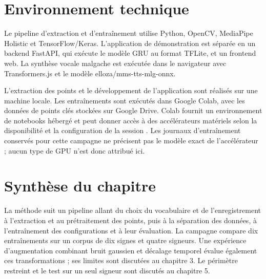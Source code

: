 \section{Environnement technique}

Le pipeline d'extraction et d'entraînement utilise Python, OpenCV, MediaPipe Holistic et TensorFlow/Keras. L'application de démonstration est séparée en un backend FastAPI, qui exécute le modèle GRU au format TFLite, et un frontend web. La synthèse vocale malgache est exécutée dans le navigateur avec Transformers.js et le modèle elloza/mms-tts-mlg-onnx.

L'extraction des points et le développement de l'application sont réalisés sur une machine locale. Les entraînements sont exécutés dans Google Colab, avec les données de points clés stockées sur Google Drive. Colab fournit un environnement de notebooks hébergé et peut donner accès à des accélérateurs matériels selon la disponibilité et la configuration de la session . Les journaux d'entraînement conservés pour cette campagne ne précisent pas le modèle exact de l'accélérateur ; aucun type de GPU n'est donc attribué ici.

\section{Synthèse du chapitre}

La méthode suit un pipeline allant du choix du vocabulaire et de l'enregistrement à l'extraction et au prétraitement des points, puis à la séparation des données, à l'entraînement des configurations et à leur évaluation. La campagne compare dix entraînements sur un corpus de dix signes et quatre signeurs. Une expérience d'augmentation combinant bruit gaussien et décalage temporel évalue également ces transformations ; ses limites sont discutées au chapitre 3. Le périmètre restreint et le test sur un seul signeur sont discutés au chapitre 5.
